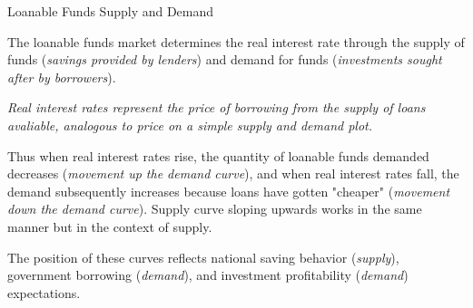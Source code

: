 \documentclass[10pt]{article}
\begin{document}
    \begin{core}{Loanable Funds Supply and Demand}

      The loanable funds market determines the real interest rate through the supply of funds (\textit{savings provided by lenders}) and demand for funds (\textit{investments sought after by borrowers}).

      \textit{Real interest rates represent the price of borrowing from the supply of loans avaliable, analogous to price on a simple supply and demand plot.}

      Thus when real interest rates rise, the quantity of loanable funds demanded decreases (\textit{movement up the demand curve}), and when real interest rates fall, the demand subsequently increases because loans have gotten "cheaper" (\textit{movement down the demand curve}). Supply curve sloping upwards works in the same manner but in the context of supply.

      The position of these curves reflects national saving behavior (\textit{supply}), government borrowing (\textit{demand}), and investment profitability (\textit{demand}) expectations. 


    \end{core}
\end{document}
